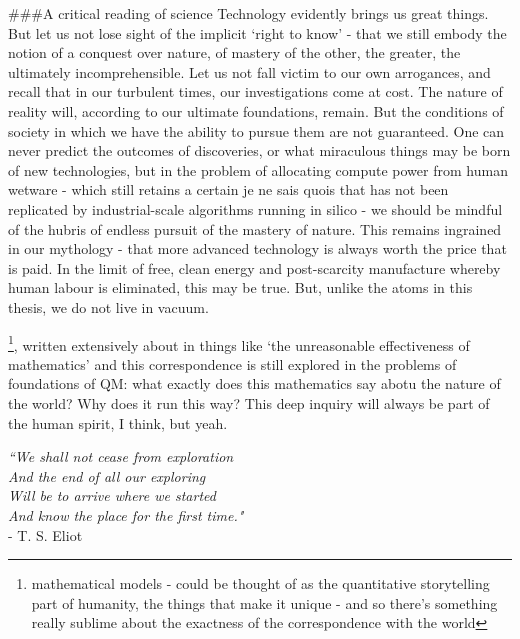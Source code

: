 \#\#\#A critical reading of science Technology evidently brings us great
things. But let us not lose sight of the implicit `right to know' - that
we still embody the notion of a conquest over nature, of mastery of the
other, the greater, the ultimately incomprehensible. Let us not fall
victim to our own arrogances, and recall that in our turbulent times,
our investigations come at cost. The nature of reality will, according
to our ultimate foundations, remain. But the conditions of society in
which we have the ability to pursue them are not guaranteed. One can
never predict the outcomes of discoveries, or what miraculous things may
be born of new technologies, but in the problem of allocating compute
power from human wetware - which still retains a certain je ne sais
quois that has not been replicated by industrial-scale algorithms
running in silico - we should be mindful of the hubris of endless
pursuit of the mastery of nature. This remains ingrained in our
mythology - that more advanced technology is always worth the price that
is paid. In the limit of free, clean energy and post-scarcity
manufacture whereby human labour is eliminated, this may be true. But,
unlike the atoms in this thesis, we do not live in vacuum.


\footnote{mathematical models - could be thought of as the quantitative storytelling part of humanity, the things that make it unique - and so there's something really sublime about the exactness of the correspondence with the world}, written extensively about in things like `the unreasonable effectiveness of mathematics' and this correspondence is still explored in the problems of foundations of QM: what exactly does this mathematics say abotu the nature of the world? Why does it run this way? This deep inquiry will always be part of the human spirit, I think, but yeah. 

\vfill
\begin{flushright}
\emph{``We shall not cease from exploration\\
And the end of all our exploring \\
Will be to arrive where we started \\
And know the place for the first time."\\} 
- T. S. Eliot
\end{flushright}

